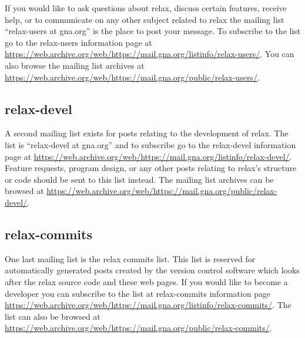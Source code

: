 If you would like to ask questions about relax, discuss certain features, receive help, or to communicate on any other subject related to relax the mailing list ``relax-users at gna.org'' is the place to post your message.
To subscribe to the list go to the relax-users information page at \href{https://web.archive.org/web/https://mail.gna.org/listinfo/relax-users/}{https://web.archive.org/web/https://mail.gna.org/listinfo/relax-users/}.
You can also browse the mailing list archives at \href{https://web.archive.org/web/https://mail.gna.org/public/relax-users/}{https://web.archive.org/web/https://mail.gna.org/public/relax-users/}.


\subsection{relax-devel} \label{sect: relax-devel mailing list}

A second mailing list exists for posts relating to the development of relax.
The list is ``relax-devel at gna.org'' and to subscribe go to the relax-devel information page at \href{https://web.archive.org/web/https://mail.gna.org/listinfo/relax-devel/}{https://web.archive.org/web/https://mail.gna.org/listinfo/relax-devel/}.
Feature requests, program design, or any other posts relating to relax's structure or code should be sent to this list instead.
The mailing list archives can be browsed at \href{https://web.archive.org/web/https://mail.gna.org/public/relax-devel/}{https://web.archive.org/web/https://mail.gna.org/public/relax-devel/}.


\subsection{relax-commits}

One last mailing list is the relax commits list.
This list is reserved for automatically generated posts created by the version control software which looks after the relax source code and these web pages.
If you would like to become a developer you can subscribe to the list at relax-commits information page \href{https://mail.gna.oactuallyrg/listinfo/relax-commits/}{https://web.archive.org/web/https://mail.gna.org/listinfo/relax-commits/}.
The list can also be browsed at \href{https://web.archive.org/web/https://mail.gna.org/public/relax-commits/}{https://web.archive.org/web/https://mail.gna.org/public/relax-commits/}.


